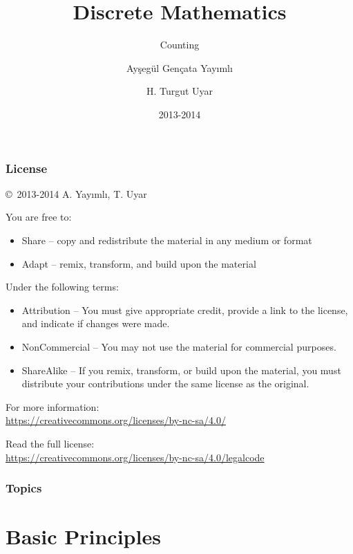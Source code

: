 \documentclass[dvipsnames]{beamer}
\title{Discrete Mathematics}
\subtitle{Counting}
\author{Ayşegül Gençata Yayımlı \and H. Turgut Uyar}
\date{2013-2014}
\begin{document}
\begin{frame}
  \titlepage
\end{frame}

\begin{frame}
  \frametitle{License}

  \hfill
  \copyright~2013-2014 A. Yayımlı, T. Uyar

  \vfill
  \begin{footnotesize}
    You are free to:
    \begin{itemize}
      \itemsep0em
      \item Share -- copy and redistribute the material in any medium or format
      \item Adapt -- remix, transform, and build upon the material
    \end{itemize}

    Under the following terms:
    \begin{itemize}
      \itemsep0em
      \item Attribution -- You must give appropriate credit, provide a link to
        the license, and indicate if changes were made.

      \item NonCommercial -- You may not use the material for commercial
        purposes.

      \item ShareAlike -- If you remix, transform, or build upon the material,
        you must distribute your contributions under the same license as the
        original.
    \end{itemize}
  \end{footnotesize}

  \begin{small}
    For more information:\\
    \url{https://creativecommons.org/licenses/by-nc-sa/4.0/}

    \smallskip
    Read the full license:\\
    \url{https://creativecommons.org/licenses/by-nc-sa/4.0/legalcode}
  \end{small}
\end{frame}

\begin{frame}
  \frametitle{Topics}
  \tableofcontents
\end{frame}

\section{Basic Principles}
\end{document}
